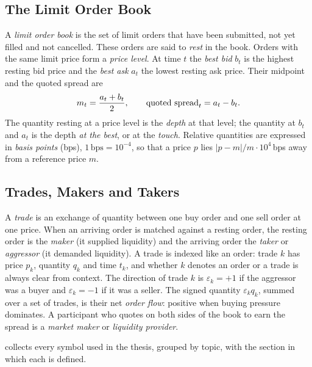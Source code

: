 \subsection{The Limit Order Book}

A \emph{limit order book} is the set of limit orders that have been
submitted, not yet filled and not cancelled. These orders are said to
\emph{rest} in the book. Orders with the same limit price form a
\emph{price level}. At time $t$ the \emph{best bid} $b_t$ is the highest
resting bid price and the \emph{best ask} $a_t$ the lowest resting ask
price. Their midpoint and the quoted spread are
\begin{equation}
  \label{eq:midpoint}
  m_{t} = \frac{a_t + b_t}{2},
  \qquad
  \text{quoted spread}_t = a_t - b_t .
\end{equation}
The quantity resting at a price level is the \emph{depth} at that level;
the quantity at $b_t$ and $a_t$ is the depth \emph{at the best}, or at
the \emph{touch}. Relative quantities are expressed in \emph{basis points}
(bps), $1\,\text{bps} = 10^{-4}$, so that a price $p$ lies
$|p - m|/m \cdot 10^{4}$\,bps away from a reference price $m$.

\subsection{Trades, Makers and Takers}

A \emph{trade} is an exchange of quantity between one buy order and one
sell order at one price. When an arriving order is matched against a
resting order, the resting order is the \emph{maker} (it supplied
liquidity) and the arriving order the \emph{taker} or \emph{aggressor} (it
demanded liquidity). A trade is indexed like an order: trade $k$ has price
$p_k$, quantity $q_k$ and time $t_k$, and whether $k$ denotes an order or a
trade is always clear from context. The direction of trade $k$ is
$\varepsilon_k = +1$ if the aggressor was a buyer and $\varepsilon_k = -1$
if it was a seller. The signed quantity $\varepsilon_k q_k$, summed over a
set of trades, is their net \emph{order flow}: positive when buying
pressure dominates. A participant who quotes on both sides of the book to
earn the spread is a \emph{market maker} or \emph{liquidity provider}.

 collects every symbol used in the thesis, grouped by
topic, with the section in which each is defined.

